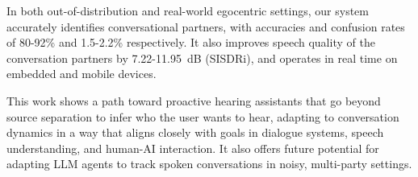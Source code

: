 In both out-of-distribution and real-world  egocentric  settings, our system accurately identifies conversational partners, with accuracies and confusion rates of 80-92\% and 1.5-2.2\% respectively. It also improves speech quality of the conversation partners by 7.22-11.95~dB (SISDRi), and operates in real time on embedded and mobile devices.


This work shows a path toward proactive hearing assistants that go beyond source separation to infer who the user wants to hear, adapting to  conversation dynamics in a way that aligns closely with goals in dialogue systems, speech understanding, and human-AI interaction.  It also offers future potential for adapting LLM agents to track spoken conversations in noisy, multi-party settings.

